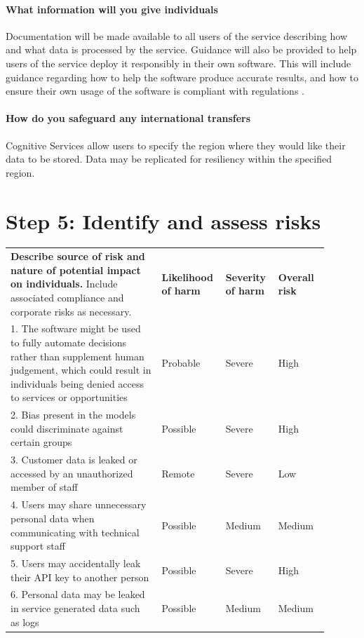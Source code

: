 \documentclass[12pt]{extarticle}
\begin{document}
\paragraph{What information will you give individuals}
Documentation will be made available to all users of the service describing how and what data is processed by the service. 
Guidance will also be provided to help users of the service deploy it responsibly in their own software.
This will include guidance regarding how to help the software produce accurate results, and how to ensure their own usage of the software is compliant with regulations \cite{transparencynote}.

\paragraph{How do you safeguard any international transfers}
Cognitive Services allow users to specify the region where they would like their data to be stored. 
Data may be replicated for resiliency within the specified region.


\section*{Step 5: Identify and assess risks}



\begin{table}[H]
\centering
\begin{tabular}{p{0.45\linewidth}p{0.15\linewidth}p{0.15\linewidth}p{0.15\linewidth}}
\hline
\textbf{Describe source of risk and nature of potential impact on individuals. }Include associated compliance and corporate risks as necessary. & 
\textbf{Likelihood of harm} & 
\textbf{Severity of harm} & 
\textbf{Overall risk} \\
\hhline{----}
1. The software might be used to fully automate decisions rather than supplement human judgement, which could result in individuals being denied access to services or opportunities &
Probable & 
Severe & 
High \\
\hhline{----}
2. Bias present in the models could discriminate against certain groups &
Possible & 
Severe & 
High \\
\hhline{----}
3. Customer data is leaked or accessed by an unauthorized member of staff &
Remote & 
Severe & 
Low \\
\hhline{----}
4. Users may share unnecessary personal data when communicating with technical support staff &
Possible & 
Medium & 
Medium \\
\hhline{----}
5. Users may accidentally leak their API key to another person &
Possible & 
Severe& 
High \\
\hhline{----}
6. Personal data may be leaked in service generated data such as logs&
Possible & 
Medium & 
Medium \\
\end{tabular}
\end{table}
\end{document}
